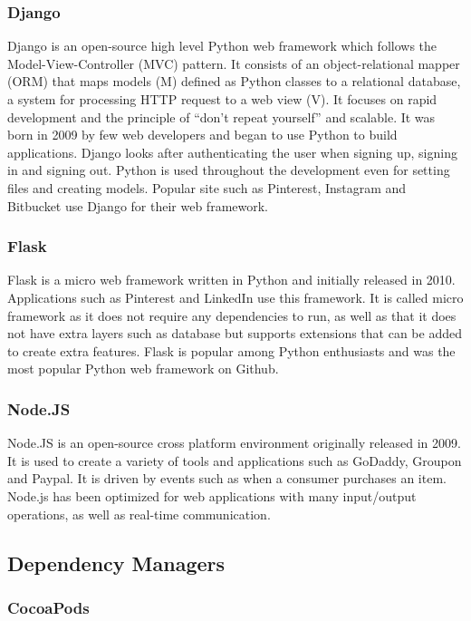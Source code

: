 \subsubsection{Django}
Django \cite{django} is an open-source  high level Python web framework which follows the Model-View-Controller (MVC) pattern.  It consists of an object-relational mapper (ORM) that maps models (M)  defined as Python classes to a relational database, a system for processing  HTTP request to a web view (V).  It focuses on rapid development and the principle of  “don’t repeat yourself” and scalable. It was born in 2009 by few web developers and began to use Python to build applications. Django looks after authenticating the user when signing up, signing in and signing out. Python is used throughout the development even for setting files and creating models. Popular site such as Pinterest, Instagram and Bitbucket use Django for their web framework.

\subsubsection{Flask}
Flask \cite{flask} is a micro web framework written in Python and initially released in 2010. Applications such as Pinterest and LinkedIn use this framework. It is called micro framework as it does not require any dependencies to run, as well as that it does not have extra layers such as database but supports extensions that can be added to create extra features. Flask is popular among Python enthusiasts and was the most popular Python web framework on Github.

\subsubsection{Node.JS}
Node.JS \cite{node} is an open-source cross platform environment originally released in 2009. It is used to create a variety of tools and applications such as GoDaddy, Groupon and Paypal.  It is driven by events such as when a consumer purchases an item. Node.js has been optimized for web applications with many input/output operations, as well as real-time communication.

\subsection{Dependency Managers}

\subsubsection{CocoaPods}

